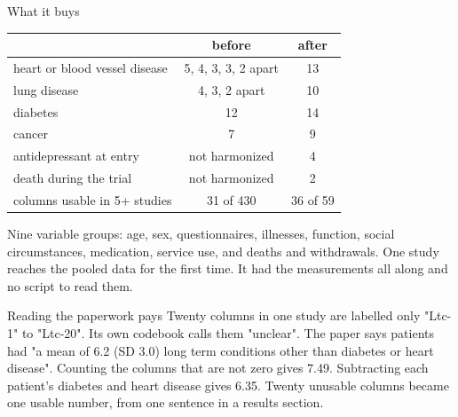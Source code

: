 \documentclass[11pt, t, handout]{beamer}
\newcommand{\ans}[1]{\textcolor{structure.fg}{#1}}
\begin{document}
\begin{frame}{What it buys}
  \vspace{-2pt}
  \begin{center}\footnotesize
  \begin{tabular}{lcc}
    \toprule
    & before & after \\
    \midrule
    heart or blood vessel disease & 5, 4, 3, 3, 2 apart & \ans{13} \\
    lung disease & 4, 3, 2 apart & \ans{10} \\
    diabetes & 12 & \ans{14} \\
    cancer & 7 & \ans{9} \\
    antidepressant at entry & not harmonized & \ans{4} \\
    death during the trial & not harmonized & \ans{2} \\
    \midrule
    columns usable in 5+ studies & 31 of 430 & \ans{36 of 59} \\
    \bottomrule
  \end{tabular}
  \end{center}
  \vspace{8pt}
  \pause
  {\footnotesize Nine variable groups: age, sex, questionnaires, illnesses,
   function, social circumstances, medication, service use, and deaths and
   withdrawals.}
  \vspace{4pt}
  \pause
  {\footnotesize One study reaches the pooled data for the first time. It had
   the measurements all along and no script to read them.}
\end{frame}

\begin{frame}{Reading the paperwork pays}
  \pause
  Twenty columns in one study are labelled only "Ltc-1" to "Ltc-20".
  Its own codebook calls them \ans{"unclear"}.
  \vspace{10pt}
  \pause
  The paper says patients had \ans{"a mean of 6.2 (SD 3.0) long term
  conditions other than diabetes or heart disease"}.
  \vspace{10pt}
  \pause
  Counting the columns that are not zero gives 7.49. Subtracting each
  patient's diabetes and heart disease gives \ans{6.35}.
  \vspace{10pt}
  \pause
  Twenty unusable columns became one usable number, from one sentence in a
  results section.
\end{frame}
\end{document}
